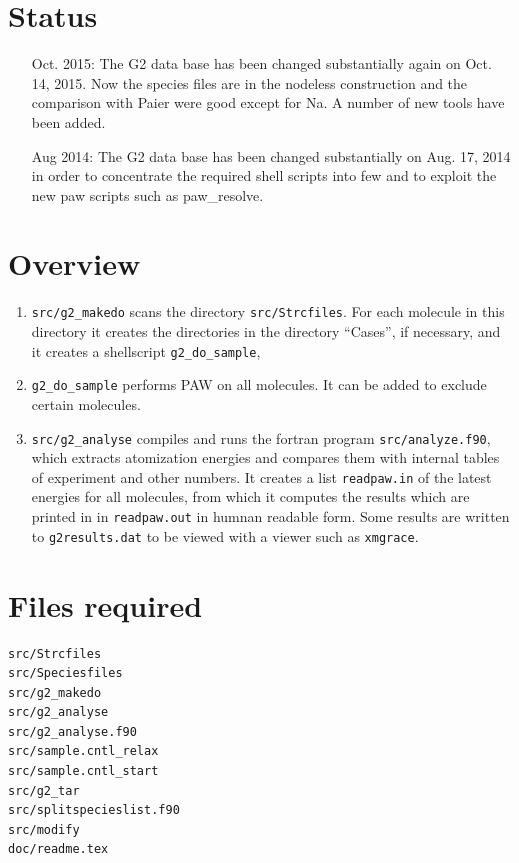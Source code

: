 \documentclass{book}
\begin{document}
\section*{Status}
\begin{itemize}
\item[Oct. 2015:] The G2 data base has been changed substantially
  again on Oct. 14, 2015. Now the species files are in the nodeless
  construction and the comparison with Paier were good except for
  Na. A number of new tools have been added.
%
\item[Aug 2014:] The G2 data base has been changed substantially on
  Aug. 17, 2014 in order to concentrate the required shell scripts
  into few and to exploit the new paw scripts such as paw\_resolve.
%
\end{itemize}

\section*{Overview}
\begin{enumerate}
\item \verb+src/g2_makedo+ scans the directory
  \verb+src/Strcfiles+. For each molecule in this directory it creates
  the directories in the directory ``Cases'', if necessary, and it
  creates a shellscript \verb|g2_do_sample|,
\item \verb|g2_do_sample| performs PAW on all molecules. It can be
  added to exclude certain molecules.
\item \verb+src/g2_analyse+ compiles and runs the fortran program
  \verb|src/analyze.f90|, which extracts atomization energies and
  compares them with internal tables of experiment and other numbers.
  It creates a list \verb+readpaw.in+ of the latest energies for all
  molecules, from which it computes the results which are printed in
  in \verb|readpaw.out| in humnan readable form. Some results are
  written to \verb+g2results.dat+ to be viewed with a viewer such as
  \verb|xmgrace|.
\end{enumerate}

\section*{Files required}
\begin{verbatim}
src/Strcfiles         
src/Speciesfiles      
src/g2_makedo         
src/g2_analyse         
src/g2_analyse.f90       
src/sample.cntl_relax 
src/sample.cntl_start
src/g2_tar
src/splitspecieslist.f90       
src/modify
doc/readme.tex
\end{verbatim}
\end{document}
